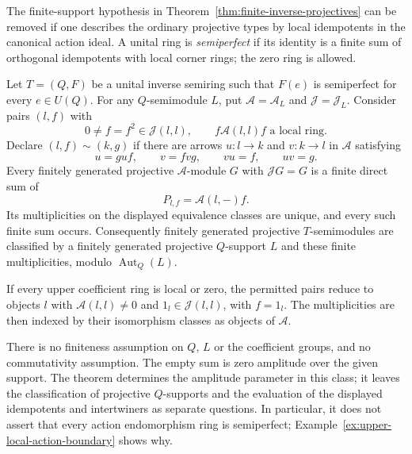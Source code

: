 The finite-support hypothesis in Theorem~\ref{thm:finite-inverse-projectives}
can be removed if one describes the ordinary projective types by local
idempotents in the canonical action ideal. A unital ring is
\emph{semiperfect} if its identity is a finite sum of orthogonal
idempotents with local corner rings; the zero ring is allowed.

\begin{theorem}
\label{thm:upper-semiperfect-amplitudes}
Let $T=(Q,F)$ be a unital inverse semiring such that $F(e)$ is
semiperfect for every $e\in U(Q)$. For any $Q$-semimodule $L$, put
$\mathcal A=\mathcal A_L$ and $\mathcal J=\mathcal J_L$. Consider pairs
$(l,f)$ with
\[
 0\ne f=f^2\in\mathcal J(l,l),\qquad
 f\mathcal A(l,l)f\text{ a local ring}.
\]
Declare $(l,f)\sim(k,g)$ if there are arrows $u:l\to k$ and
$v:k\to l$ in $\mathcal A$ satisfying
\[
 u=guf,\qquad v=fvg,\qquad vu=f,\qquad uv=g.
\]
Every finitely generated projective $\mathcal A$-module $G$ with
$\mathcal JG=G$ is a finite direct sum of
\[
 P_{l,f}=\mathcal A(l,-)f.
\]
Its multiplicities on the displayed equivalence classes are unique,
and every such finite sum occurs. Consequently finitely generated
projective $T$-semimodules are classified by a finitely generated
projective $Q$-support $L$ and these finite multiplicities, modulo
$\operatorname{Aut}_Q(L)$.

If every upper coefficient ring is local or zero, the permitted pairs
reduce to objects $l$ with $\mathcal A(l,l)\ne0$ and
$1_l\in\mathcal J(l,l)$, with $f=1_l$. The multiplicities are then
indexed by their isomorphism classes as objects of $\mathcal A$.
\end{theorem}

There is no finiteness assumption on $Q$, $L$ or the coefficient
groups, and no commutativity assumption. The empty sum is zero
amplitude over the given support. The theorem determines the
amplitude parameter in this class; it leaves the classification of
projective $Q$-supports and the evaluation of the displayed
idempotents and intertwiners as separate questions. In particular,
it does not assert that every action endomorphism ring is
semiperfect; Example~\ref{ex:upper-local-action-boundary} shows why.

